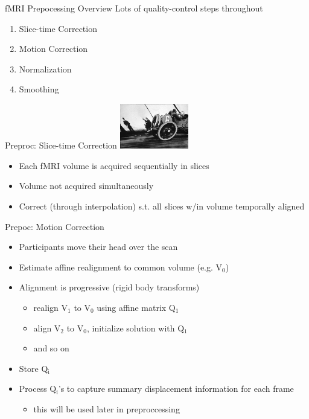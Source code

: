\documentclass[presentation]{beamer}
\begin{document}
\begin{frame}[label={sec:orgheadline8}]{fMRI Prepocessing Overview}
Lots of quality-control steps throughout
\begin{enumerate}
\item Slice-time Correction
\item Motion Correction
\item Normalization
\item Smoothing
\end{enumerate}
\end{frame}
\begin{frame}[label={sec:orgheadline9}]{Preproc: Slice-time Correction}
\includegraphics[width=3cm]{./rollingshuttercar.jpg}
\begin{itemize}
\item Each fMRI volume is acquired sequentially in slices
\item Volume not acquired simultaneously
\item Correct (through interpolation) s.t. all slices w/in volume temporally aligned
\end{itemize}
\end{frame}
\begin{frame}[label={sec:orgheadline10}]{Prepoc: Motion Correction}
\begin{itemize}
\item Participants move their head over the scan
\item Estimate affine realignment to common volume (e.g. V\(_{\text{0}}\))
\item Alignment is progressive (rigid body transforms)
\begin{itemize}
\item realign V\(_{\text{1}}\) to V\(_{\text{0}}\) using affine matrix Q\(_{\text{1}}\)
\item align V\(_{\text{2}}\) to V\(_{\text{0}}\), initialize solution with Q\(_{\text{1}}\)
\item and so on
\end{itemize}
\item Store Q\(_{\text{i}}\)
\item Process Q\(_{\text{i}}\)'s to capture summary displacement information for each frame
\begin{itemize}
\item this will be used later in preproccessing
\end{itemize}
\end{itemize}
\end{frame}
\end{document}

